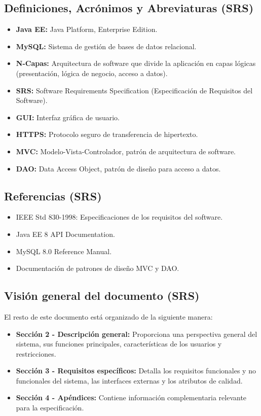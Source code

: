 \subsection{Definiciones, Acrónimos y Abreviaturas (SRS)}
\label{srs:definiciones}
\begin{itemize}
\item \textbf{Java EE:} Java Platform, Enterprise Edition.
\item \textbf{MySQL:} Sistema de gestión de bases de datos relacional.
\item \textbf{N-Capas:} Arquitectura de software que divide la aplicación en capas lógicas (presentación, lógica de negocio, acceso a datos).
\item \textbf{SRS:} Software Requirements Specification (Especificación de Requisitos del Software).
\item \textbf{GUI:} Interfaz gráfica de usuario.
\item \textbf{HTTPS:} Protocolo seguro de transferencia de hipertexto.
\item \textbf{MVC:} Modelo-Vista-Controlador, patrón de arquitectura de software.
\item \textbf{DAO:} Data Access Object, patrón de diseño para acceso a datos.
\end{itemize}

\subsection{Referencias (SRS)}
\label{srs:referencias}
\begin{itemize}
\item IEEE Std 830-1998: Especificaciones de los requisitos del software.
\item Java EE 8 API Documentation.
\item MySQL 8.0 Reference Manual.
\item Documentación de patrones de diseño MVC y DAO.
\end{itemize}

\subsection{Visión general del documento (SRS)}
\label{srs:vision}
El resto de este documento está organizado de la siguiente manera:
\begin{itemize}
\item \textbf{Sección 2 - Descripción general:} Proporciona una perspectiva general del sistema, sus funciones principales, características de los usuarios y restricciones.
\item \textbf{Sección 3 - Requisitos específicos:} Detalla los requisitos funcionales y no funcionales del sistema, las interfaces externas y los atributos de calidad.
\item \textbf{Sección 4 - Apéndices:} Contiene información complementaria relevante para la especificación.
\end{itemize}

